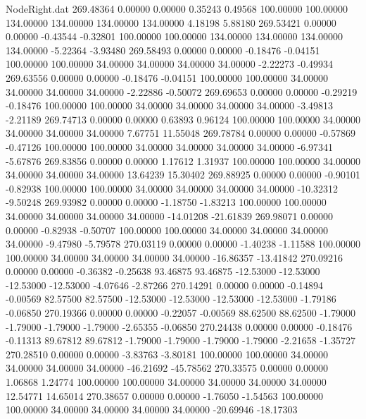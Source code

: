 \begin{filecontents}{NodeRight.dat}
 269.48364    0.00000    0.00000     0.35243    0.49568  100.00000  100.00000  134.00000  134.00000  134.00000  134.00000    4.18198    5.88180
 269.53421    0.00000    0.00000    -0.43544   -0.32801  100.00000  100.00000  134.00000  134.00000  134.00000  134.00000   -5.22364   -3.93480
 269.58493    0.00000    0.00000    -0.18476   -0.04151  100.00000  100.00000   34.00000   34.00000   34.00000   34.00000   -2.22273   -0.49934
 269.63556    0.00000    0.00000    -0.18476   -0.04151  100.00000  100.00000   34.00000   34.00000   34.00000   34.00000   -2.22886   -0.50072
 269.69653    0.00000    0.00000    -0.29219   -0.18476  100.00000  100.00000   34.00000   34.00000   34.00000   34.00000   -3.49813   -2.21189
 269.74713    0.00000    0.00000     0.63893    0.96124  100.00000  100.00000   34.00000   34.00000   34.00000   34.00000    7.67751   11.55048
 269.78784    0.00000    0.00000    -0.57869   -0.47126  100.00000  100.00000   34.00000   34.00000   34.00000   34.00000   -6.97341   -5.67876
 269.83856    0.00000    0.00000     1.17612    1.31937  100.00000  100.00000   34.00000   34.00000   34.00000   34.00000   13.64239   15.30402
 269.88925    0.00000    0.00000    -0.90101   -0.82938  100.00000  100.00000   34.00000   34.00000   34.00000   34.00000  -10.32312   -9.50248
 269.93982    0.00000    0.00000    -1.18750   -1.83213  100.00000  100.00000   34.00000   34.00000   34.00000   34.00000  -14.01208  -21.61839
 269.98071    0.00000    0.00000    -0.82938   -0.50707  100.00000  100.00000   34.00000   34.00000   34.00000   34.00000   -9.47980   -5.79578
 270.03119    0.00000    0.00000    -1.40238   -1.11588  100.00000  100.00000   34.00000   34.00000   34.00000   34.00000  -16.86357  -13.41842
 270.09216    0.00000    0.00000    -0.36382   -0.25638   93.46875   93.46875  -12.53000  -12.53000  -12.53000  -12.53000   -4.07646   -2.87266
 270.14291    0.00000    0.00000    -0.14894   -0.00569   82.57500   82.57500  -12.53000  -12.53000  -12.53000  -12.53000   -1.79186   -0.06850
 270.19366    0.00000    0.00000    -0.22057   -0.00569   88.62500   88.62500   -1.79000   -1.79000   -1.79000   -1.79000   -2.65355   -0.06850
 270.24438    0.00000    0.00000    -0.18476   -0.11313   89.67812   89.67812   -1.79000   -1.79000   -1.79000   -1.79000   -2.21658   -1.35727
 270.28510    0.00000    0.00000    -3.83763   -3.80181  100.00000  100.00000   34.00000   34.00000   34.00000   34.00000  -46.21692  -45.78562
 270.33575    0.00000    0.00000     1.06868    1.24774  100.00000  100.00000   34.00000   34.00000   34.00000   34.00000   12.54771   14.65014
 270.38657    0.00000    0.00000    -1.76050   -1.54563  100.00000  100.00000   34.00000   34.00000   34.00000   34.00000  -20.69946  -18.17303

\end{filecontents}
